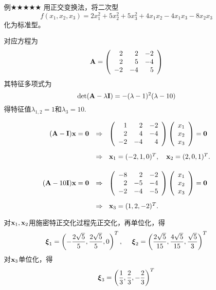 \begin{frame}
  \begin{footnotesize}
    \begin{exampleblock}{例$\bigstar\bigstar\bigstar\bigstar\bigstar$}
      用正交变换法，将二次型
      $$
      f(x_1,x_2,x_3)=2x_1^2+5x_2^2+5x_3^2+4x_1x_2-4x_1x_3-8x_2x_3
      $$
      化为标准型。
    \end{exampleblock}
    \pause\jiename
    对应方程为
    $$
    \mathbf{A}=\left(
    \begin{array}{rrr}
      2&2&-2\\
      2&5&-4\\
      -2&-4&5
    \end{array}
    \right)
    $$
    \pause
    其特征多项式为
    $$
    \det(\mathbf{A}-\lambda\mathbf{I})=-(\lambda-1)^2(\lambda-10)
    $$
    得特征值$\lambda_{1,2}=1$和$\lambda_3=10$.
  \end{footnotesize}
\end{frame}


\begin{frame}
  \begin{footnotesize}
    $$
    \begin{array}{rl}
      (\mathbf{A}-\mathbf{I})\mathbf{x}=\mathbf{0} & \Rightarrow~~
      \left(
      \begin{array}{rrr}
        1&2&-2\\
      2&4&-4\\
      -2&-4&4
      \end{array}
      \right)\left(
      \begin{array}{c}
        x_1\\
        x_2\\
        x_3
      \end{array}
      \right)=\mathbf{0}\\[0.3in]  
      & \Rightarrow~~
      \mathbf{x}_1=(-2,1,0)^T, \quad
      \mathbf{x}_2=(2,0,1)^T. \\[0.2in] 
      (\mathbf{A}-10\mathbf{I})\mathbf{x}=\mathbf{0} & \Rightarrow~~
      \left(
      \begin{array}{rrr}
       -8&2&-2\\
      2&-5&-4\\
      -2&-4&-5
      \end{array}
      \right)\left(
      \begin{array}{c}
        x_1\\
        x_2\\
        x_3
      \end{array}
      \right)=\mathbf{0}\\[0.3in]  
      & \Rightarrow~~
      \mathbf{x}_3=(1,2,-2)^T.
    \end{array}
    $$ \pause 

    对$\mathbf{x}_1,\mathbf{x}_2$用施密特正交化过程先正交化，再单位化，得
    $$
    \boldsymbol{\xi}_1=\left(-\frac{2\sqrt{5}}5,\frac{2\sqrt{5}}5,0\right)^T,~~~~
    \boldsymbol{\xi}_2=\left(\frac{2\sqrt{5}}{15},\frac{4\sqrt{5}}{15},\frac{\sqrt{5}}3\right)^T
    $$ 
    对$\mathbf{x}_3$单位化，得
    $$
    \boldsymbol{\xi}_3=\left(\frac13,\frac23,-\frac23\right)^T
    $$
  \end{footnotesize}
\end{frame}


